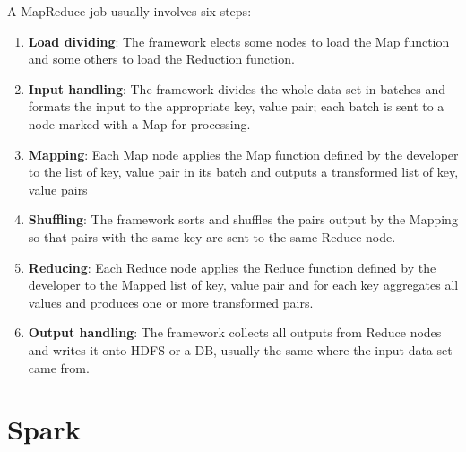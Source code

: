 A MapReduce job usually involves six steps:

\begin{enumerate}
	\item \textbf{Load dividing}: The framework elects some nodes to load the Map function and some others to load the Reduction function.
	\item \textbf{Input handling}: The framework divides the whole data set in batches and formats the input to the appropriate key, value pair; each batch is sent to a node marked with a Map for processing.
	\item \textbf{Mapping}: Each Map node applies the Map function defined by the developer to the list of key, value pair in its batch and outputs a transformed list of key, value pairs
	\item \textbf{Shuffling}: The framework sorts and shuffles the pairs output by the Mapping so that pairs with the same key are sent to the same Reduce node.
	\item \textbf{Reducing}: Each Reduce node applies the Reduce function defined by the developer to the Mapped list of key, value pair and for each key aggregates all values and produces one or more transformed pairs.
	\item \textbf{Output handling}: The framework collects all outputs from Reduce nodes and writes it onto HDFS or a DB, usually the same where the input data set came from.
\end{enumerate}

 \pagebreak
 
\section{Spark} \label{Spark}

